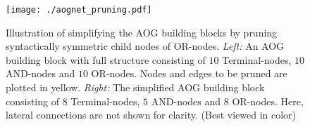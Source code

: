 \documentclass[10pt,twocolumn,letterpaper]{article}
\begin{document}


\begin{figure} %
    	\centering
    	\texttt{[image: ./aognet\_pruning.pdf]}
    	\caption{\small{Illustration of simplifying the AOG building blocks by pruning syntactically symmetric child nodes of OR-nodes. \textit{Left:} An AOG building block with full structure consisting of  $10$ Terminal-nodes, $10$ AND-nodes and $10$ OR-nodes. Nodes and edges to be pruned are plotted in yellow. \textit{Right:} The simplified AOG building block consisting of  $8$ Terminal-nodes, $5$ AND-nodes and $8$ OR-nodes. Here, lateral connections are not shown for clarity. (Best viewed in color)}
    	}
    	\label{fig:pruning} %
\end{figure}
\end{document}
